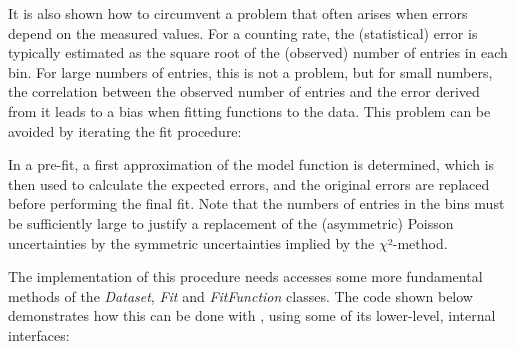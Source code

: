 \documentclass[a4paper,10pt,english]{sphinxmanual}
\begin{document}
It is also shown how to circumvent a problem that
often arises when errors depend on the measured values.
For a counting rate, the (statistical) error is typically estimated
as the square root of the (observed) number of entries in each bin.
For large numbers of entries, this is not a problem,
but for small numbers, the correlation between the observed
number of entries and the error derived from it leads to a
bias when fitting functions to the data. This problem can be
avoided by iterating the fit procedure:

In a pre-fit, a first approximation of the model function is
determined, which is then used to calculate
the expected errors, and the original errors are
replaced before performing the final fit. Note that the numbers
of entries in the bins must be sufficiently large to justify
a replacement of the (asymmetric) Poisson uncertainties by
the symmetric uncertainties implied by the \(\chi\)²-method.

The implementation of this  procedure needs accesses some
more fundamental methods of the \emph{Dataset}, \emph{Fit} and
\emph{FitFunction} classes. The code shown below demonstrates
how this can be done with , using some of its lower-level,
internal interfaces:
\end{document}
